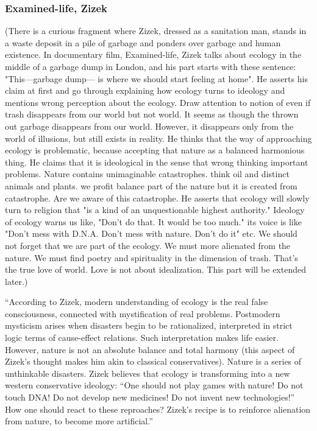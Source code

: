 \documentclass[12pt]{article}
\providecommand{\quotes}[1]{``#1''}
\begin{document}
\subsubsection{Examined-life, Zizek}
(There is a curious fragment where Zizek, dressed as a sanitation man, stands in a waste deposit in a pile of garbage and ponders over garbage and human existence. In documentary film, Examined-life, Zizek talks about ecology in the middle of a garbage dump in London, and his part starts with these sentence: "This---garbage dump--- is where we should start feeling at home". He asserts his claim at first and go through explaining how ecology turns to ideology and mentions wrong perception about the ecology. Draw attention to notion of even if trash disappears from our world but not world. It seems as though the thrown out garbage disappears from
our world. However, it disappears only from the world of illusions, but still exists in reality. He thinks that the way of approaching ecology is problematic, because accepting that nature as a balanced harmonious thing. He claims that it is ideological in the sense that wrong thinking important problems. Nature contains unimaginable catastrophes. think oil and distinct animals and plants. we profit balance part of the nature but it is created from catastrophe. Are we aware of this catastrophe. He asserts that ecology will slowly turn to religion that "is a kind of an unquestionable highest authority." Ideology of ecology warns us like, "Don't do that. It would be too much." its voice is like "Don't mess with D.N.A. Don't mess with nature. Don't do it" etc. We should not forget that we are part of the ecology. We must more alienated from the nature. We must find poetry and spirituality in the dimension of trash. That's the true love of world. Love is not about idealization. This part will be extended later.)

\quotes{According to Zizek, modern understanding of ecology is the real false consciousness, connected with mystification of real problems. Postmodern mysticism arises when disasters begin to be rationalized, interpreted in strict logic terms of cause-effect relations. Such interpretation makes life easier. However, nature is not an absolute balance and total harmony (this aspect of Zizek’s thought makes him akin to classical conservatives). Nature is a series of unthinkable disasters. Zizek believes that ecology is transforming into a new western conservative ideology: “One should not play games with nature! Do not touch DNA! Do not develop new medicines! Do not invent new technologies!” How one should react to these reproaches? Zizek’s recipe is to reinforce alienation from nature, to become more artificial.} \cite{vafin2012zizek}
\end{document}
